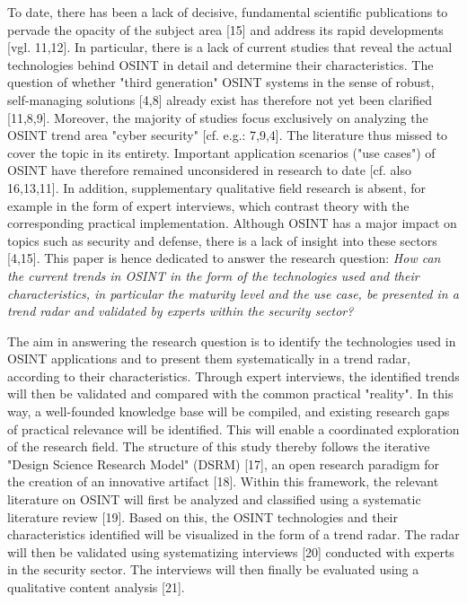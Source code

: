 \documentclass[10pt]{article}
\begin{document}
To date, there has been a lack of decisive, fundamental scientific publications to pervade the opacity of the subject area [15] and address its rapid developments [vgl. 11,12]. In particular, there is a lack of current studies that reveal the actual technologies behind OSINT in detail and determine their characteristics. The question of whether "third generation" OSINT systems in the sense of robust, self-managing solutions [4,8] already exist has therefore not yet been clarified [11,8,9]. Moreover, the majority of studies focus exclusively on analyzing the OSINT trend area "cyber security" [cf. e.g.: 7,9,4]. The literature thus missed to cover the topic in its entirety. Important application scenarios ("use cases") of OSINT have therefore remained unconsidered in research to date [cf. also 16,13,11]. In addition, supplementary qualitative field research is absent, for example in the form of expert interviews, which contrast theory with the corresponding practical implementation. Although OSINT has a major impact on topics such as security and defense, there is a lack of insight into these sectors [4,15]. This paper is hence dedicated to answer the research question:  \textit{How can the current trends in OSINT in the form of the technologies used and their characteristics, in particular the maturity level and the use case, be presented in a trend radar and validated by experts within the security sector?}

The aim in answering the research question is to identify the technologies used in OSINT applications and to present them systematically in a trend radar, according to their characteristics. Through expert interviews, the identified trends will then be validated and compared with the common practical "reality". In this way, a well-founded knowledge base will be compiled, and existing research gaps of practical relevance will be identified. This will enable a coordinated exploration of the research field. The structure of this study thereby follows the iterative "Design Science Research Model" (DSRM) [17], an open research paradigm for the creation of an innovative artifact [18]. Within this framework, the relevant literature on OSINT will first be analyzed and classified using a systematic literature review [19]. Based on this, the OSINT technologies and their characteristics identified will be visualized in the form of a trend radar. The radar will then be validated using systematizing interviews [20] conducted with experts in the security sector. The interviews will then finally be evaluated using a qualitative content analysis [21].
\end{document}

